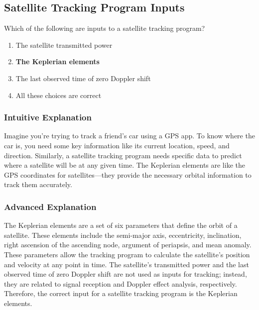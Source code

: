 \subsection{Satellite Tracking Program Inputs}
\label{T8B06}

\begin{tcolorbox}[colback=gray!10!white,colframe=black!75!black,title=T8B06]
Which of the following are inputs to a satellite tracking program?
\begin{enumerate}[noitemsep]
    \item The satellite transmitted power
    \item \textbf{The Keplerian elements}
    \item The last observed time of zero Doppler shift
    \item All these choices are correct
\end{enumerate}
\end{tcolorbox}

\subsubsection*{Intuitive Explanation}
Imagine you're trying to track a friend's car using a GPS app. To know where the car is, you need some key information like its current location, speed, and direction. Similarly, a satellite tracking program needs specific data to predict where a satellite will be at any given time. The Keplerian elements are like the GPS coordinates for satellites—they provide the necessary orbital information to track them accurately.

\subsubsection*{Advanced Explanation}
The Keplerian elements are a set of six parameters that define the orbit of a satellite. These elements include the semi-major axis, eccentricity, inclination, right ascension of the ascending node, argument of periapsis, and mean anomaly. These parameters allow the tracking program to calculate the satellite's position and velocity at any point in time. The satellite's transmitted power and the last observed time of zero Doppler shift are not used as inputs for tracking; instead, they are related to signal reception and Doppler effect analysis, respectively. Therefore, the correct input for a satellite tracking program is the Keplerian elements.